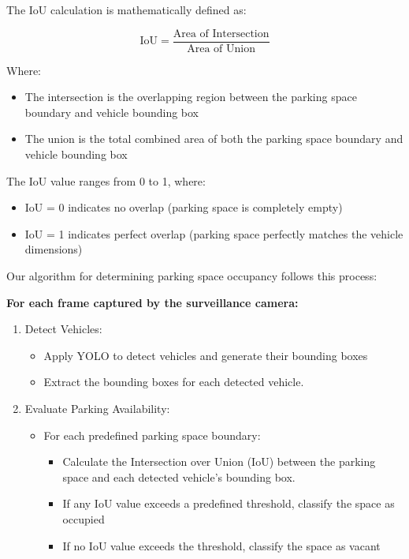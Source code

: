 The IoU calculation is mathematically defined as:

\[
\text{IoU} = \frac{\text{Area of Intersection}}{\text{Area of Union}}
\]

Where:
\begin{itemize}
    \item The intersection is the overlapping region between the parking space boundary and vehicle bounding box
    \item The union is the total combined area of both the parking space boundary and vehicle bounding box
\end{itemize}

The IoU value ranges from 0 to 1, where:
\begin{itemize}
    \item IoU = 0 indicates no overlap (parking space is completely empty)
    \item IoU = 1 indicates perfect overlap (parking space perfectly matches the vehicle dimensions)
\end{itemize}

Our algorithm for determining parking space occupancy follows this process:

\noindent \textbf {For each frame captured by the surveillance camera:}
\begin{enumerate}
    \item Detect Vehicles:
    \begin{itemize}
        \item Apply YOLO to detect vehicles and generate their bounding boxes
        \item Extract the bounding boxes for each detected vehicle.
    \end{itemize}
    \item Evaluate Parking Availability:
    \begin{itemize}
        \item For each predefined parking space boundary:
        \begin{itemize}
            \item Calculate the Intersection over Union (IoU) between the parking space and each detected vehicle's bounding box.
            \item If any IoU value exceeds a predefined threshold, classify the
space as occupied
            \item If no IoU value exceeds the threshold, classify the space as
vacant
        \end{itemize}
    \end{itemize}
\end{enumerate}
    
